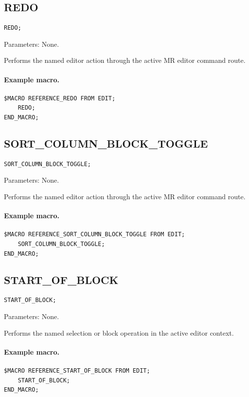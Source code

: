 \documentclass[a4paper,10pt,twoside,openany]{book}
\newenvironment{mrmacextension}{\begin{changebar}}{\end{changebar}}
\begin{document}
\label{prim:procedure-redo}
\subsection*{REDO}
\begin{verbatim}
REDO;
\end{verbatim}
Parameters: None.

Performs the named editor action through the active MR editor command route.

\paragraph{Example macro.}
\begin{verbatim}
$MACRO REFERENCE_REDO FROM EDIT;
    REDO;
END_MACRO;
\end{verbatim}

\begin{mrmacextension}
\label{prim:procedure-sort-column-block-toggle}
\subsection*{SORT\_COLUMN\_BLOCK\_TOGGLE}
\begin{verbatim}
SORT_COLUMN_BLOCK_TOGGLE;
\end{verbatim}
Parameters: None.

Performs the named editor action through the active MR editor command route.

\paragraph{Example macro.}
\begin{verbatim}
$MACRO REFERENCE_SORT_COLUMN_BLOCK_TOGGLE FROM EDIT;
    SORT_COLUMN_BLOCK_TOGGLE;
END_MACRO;
\end{verbatim}
\end{mrmacextension}

\begin{mrmacextension}
\label{prim:procedure-start-of-block}
\subsection*{START\_OF\_BLOCK}
\begin{verbatim}
START_OF_BLOCK;
\end{verbatim}
Parameters: None.

Performs the named selection or block operation in the active editor context.

\paragraph{Example macro.}
\begin{verbatim}
$MACRO REFERENCE_START_OF_BLOCK FROM EDIT;
    START_OF_BLOCK;
END_MACRO;
\end{verbatim}
\end{mrmacextension}
\end{document}
